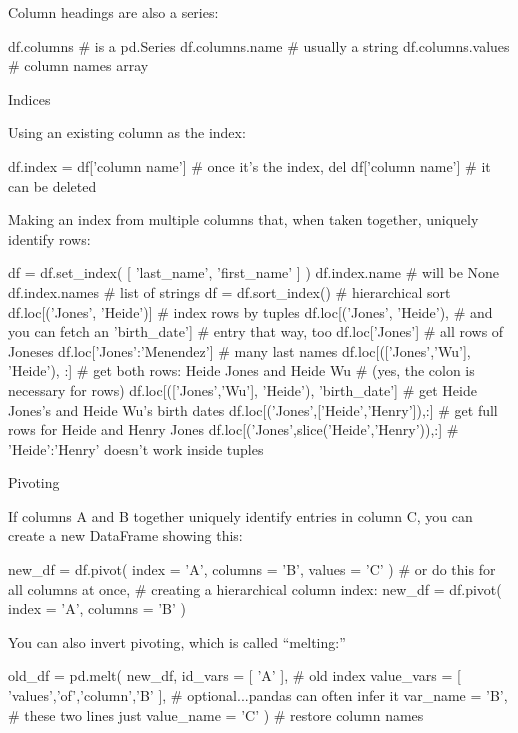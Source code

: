 \documentclass[a4paper,landscape,columns=3]{cheatsheet}
\def\sect#1{\begin{tcolorbox}[colback=blue!5!white,colframe=blue!75!black,size=title,leftrule=2mm]
    \large #1
\end{tcolorbox}}
\begin{document}
Column headings are also a series:
\begin{python}
df.columns                    # is a pd.Series
df.columns.name               # usually a string
df.columns.values             # column names array
\end{python}

\sect{Indices}

Using an existing column as the index:
\begin{python}
df.index = df['column name']  # once it's the index,
del df['column name']         # it can be deleted
\end{python}

Making an index from multiple columns that, when taken together, uniquely identify rows:
\begin{python}
df = df.set_index( [ 'last_name', 'first_name' ] )
df.index.name                 # will be None
df.index.names                # list of strings
df = df.sort_index()          # hierarchical sort
df.loc[('Jones', 'Heide')]    # index rows by tuples
df.loc[('Jones', 'Heide'),    # and you can fetch an
       'birth_date']          # entry that way, too
df.loc['Jones']               # all rows of Joneses
df.loc['Jones':'Menendez']    # many last names
df.loc[(['Jones','Wu'], 'Heide'), :]
      # get both rows: Heide Jones and Heide Wu
      # (yes, the colon is necessary for rows)
df.loc[(['Jones','Wu'], 'Heide'), 'birth_date']
      # get Heide Jones's and Heide Wu's birth dates
df.loc[('Jones',['Heide','Henry']),:]
      # get full rows for Heide and Henry Jones
df.loc[('Jones',slice('Heide','Henry')),:]
      # 'Heide':'Henry' doesn't work inside tuples
\end{python}

\sect{Pivoting}

If columns A and B together uniquely identify entries in column C, you can create a new DataFrame showing this:
\begin{python}
new_df = df.pivot( index   = 'A',
                   columns = 'B',
                   values  = 'C' )
# or do this for all columns at once,
# creating a hierarchical column index:
new_df = df.pivot( index   = 'A',
                   columns = 'B' )
\end{python}

You can also invert pivoting, which is called ``melting:''
\begin{python}
old_df = pd.melt( new_df,
    id_vars = [ 'A' ],          # old index
    value_vars = [ 'values','of','column','B' ],
        # optional...pandas can often infer it
    var_name = 'B',       # these two lines just
    value_name = 'C' )    # restore column names
\end{python}
\end{document}
